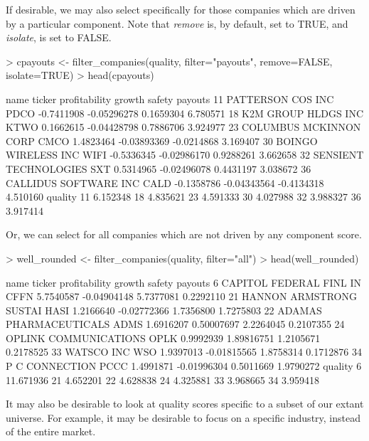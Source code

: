 \documentclass[titlepage]{article}
\begin{document}
If desirable, we may also select specifically for those companies which are driven by a particular component. Note that \textit{remove} is, by default, set to TRUE, and \textit{isolate}, is set to FALSE.

\begin{Schunk}
\begin{Sinput}
> cpayouts <- filter_companies(quality, filter="payouts", remove=FALSE, isolate=TRUE)
> head(cpayouts)
\end{Sinput}
\begin{Soutput}
                     name ticker profitability      growth     safety  payouts
11      PATTERSON COS INC   PDCO    -0.7411908 -0.05296278  0.1659304 6.780571
18    K2M GROUP HLDGS INC   KTWO     0.1662615 -0.04428798  0.7886706 3.924977
23 COLUMBUS MCKINNON CORP   CMCO     1.4823464 -0.03893369 -0.0214868 3.169407
30    BOINGO WIRELESS INC   WIFI    -0.5336345 -0.02986170  0.9288261 3.662658
32  SENSIENT TECHNOLOGIES    SXT     0.5314965 -0.02496078  0.4431197 3.038672
36  CALLIDUS SOFTWARE INC   CALD    -0.1358786 -0.04343564 -0.4134318 4.510160
    quality
11 6.152348
18 4.835621
23 4.591333
30 4.027988
32 3.988327
36 3.917414
\end{Soutput}
\end{Schunk}

Or, we can select for all companies which are not driven by any component score.

\begin{Schunk}
\begin{Sinput}
> well_rounded <- filter_companies(quality, filter="all")
> head(well_rounded)
\end{Sinput}
\begin{Soutput}
                      name ticker profitability      growth    safety   payouts
6  CAPITOL FEDERAL FINL IN   CFFN     5.7540587 -0.04904148 5.7377081 0.2292110
21 HANNON ARMSTRONG SUSTAI   HASI     1.2166640 -0.02772366 1.7356800 1.7275803
22  ADAMAS PHARMACEUTICALS   ADMS     1.6916207  0.50007697 2.2264045 0.2107355
24   OPLINK COMMUNICATIONS   OPLK     0.9992939  1.89816751 1.2105671 0.2178525
33              WATSCO INC    WSO     1.9397013 -0.01815565 1.8758314 0.1712876
34          P C CONNECTION   PCCC     1.4991871 -0.01996304 0.5011669 1.9790272
     quality
6  11.671936
21  4.652201
22  4.628838
24  4.325881
33  3.968665
34  3.959418
\end{Soutput}
\end{Schunk}

It may also be desirable to look at quality scores specific to a subset of our extant universe. For example, it may be desirable to focus on a specific industry, instead of the entire market.
\end{document}
